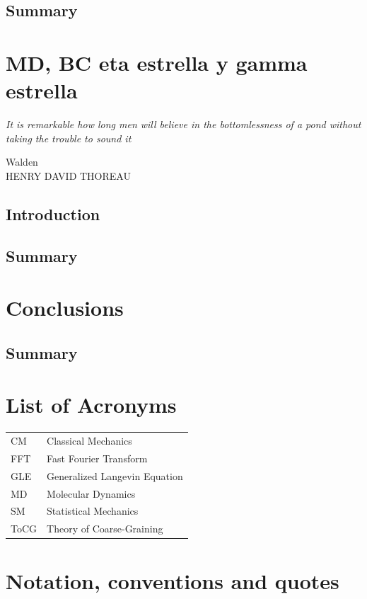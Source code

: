 \documentclass[a4paper,openright,12pt]{book}
\begin{document}
\section{Summary}

\chapter{MD, BC eta estrella y gamma estrella}\label{Chap:Coeff}
\epigraph{\textit{It is remarkable how long men will believe in the bottomlessness of a pond without taking the trouble to sound it}}{Walden \\ HENRY DAVID THOREAU}
\section{Introduction}
\section{Summary}


\chapter{Conclusions}\label{cap.Conclusions}
\section{Summary}

\appendix
\chapter{List of Acronyms}\label{aped.A}
\begin{tabular}{l l}
    CM & Classical Mechanics \\
    FFT & Fast Fourier Transform \\
    GLE & Generalized Langevin Equation \\
    MD & Molecular Dynamics \\
    SM & Statistical Mechanics \\
    ToCG & Theory of Coarse-Graining \\
\end{tabular}

\chapter{Notation, conventions and quotes}\label{aped.B}
\end{document}
